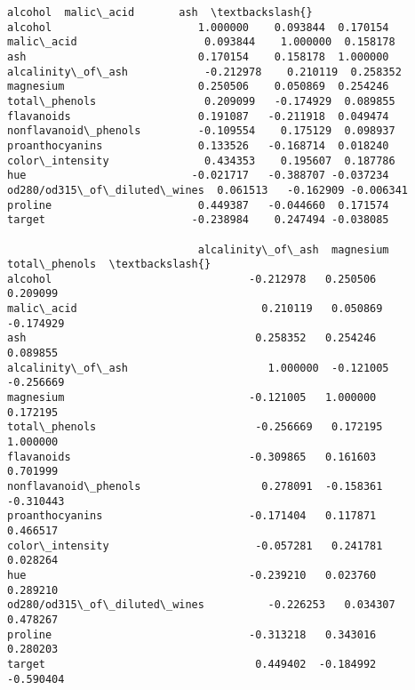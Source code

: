 \documentclass[11pt]{article}
\makeatletter
\newcommand{\boxspacing}{\kern\kvtcb@left@rule\kern\kvtcb@boxsep}
\newcommand{\prompt}[4]{
        {\ttfamily\llap{{\color{#2}[#3]:\hspace{3pt}#4}}\vspace{-\baselineskip}}
    }
\makeatother
\begin{document}
            \begin{tcolorbox}[breakable, size=fbox, boxrule=.5pt, pad at break*=1mm, opacityfill=0]
\prompt{Out}{outcolor}{119}{\boxspacing}
\begin{Verbatim}[commandchars=\\\{\}]
                               alcohol  malic\_acid       ash  \textbackslash{}
alcohol                       1.000000    0.093844  0.170154
malic\_acid                    0.093844    1.000000  0.158178
ash                           0.170154    0.158178  1.000000
alcalinity\_of\_ash            -0.212978    0.210119  0.258352
magnesium                     0.250506    0.050869  0.254246
total\_phenols                 0.209099   -0.174929  0.089855
flavanoids                    0.191087   -0.211918  0.049474
nonflavanoid\_phenols         -0.109554    0.175129  0.098937
proanthocyanins               0.133526   -0.168714  0.018240
color\_intensity               0.434353    0.195607  0.187786
hue                          -0.021717   -0.388707 -0.037234
od280/od315\_of\_diluted\_wines  0.061513   -0.162909 -0.006341
proline                       0.449387   -0.044660  0.171574
target                       -0.238984    0.247494 -0.038085

                              alcalinity\_of\_ash  magnesium  total\_phenols  \textbackslash{}
alcohol                               -0.212978   0.250506       0.209099
malic\_acid                             0.210119   0.050869      -0.174929
ash                                    0.258352   0.254246       0.089855
alcalinity\_of\_ash                      1.000000  -0.121005      -0.256669
magnesium                             -0.121005   1.000000       0.172195
total\_phenols                         -0.256669   0.172195       1.000000
flavanoids                            -0.309865   0.161603       0.701999
nonflavanoid\_phenols                   0.278091  -0.158361      -0.310443
proanthocyanins                       -0.171404   0.117871       0.466517
color\_intensity                       -0.057281   0.241781       0.028264
hue                                   -0.239210   0.023760       0.289210
od280/od315\_of\_diluted\_wines          -0.226253   0.034307       0.478267
proline                               -0.313218   0.343016       0.280203
target                                 0.449402  -0.184992      -0.590404


\end{Verbatim}
\end{tcolorbox}
\end{document}
